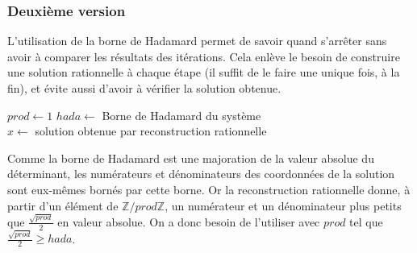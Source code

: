 \documentclass[french]{article}
\begin{document}
\subsubsection{Deuxième version} \label{subsubsec:modalg2}
L'utilisation de la borne de Hadamard permet de savoir quand s'arrêter sans avoir à comparer les résultats des itérations. Cela enlève le besoin de construire une solution rationnelle à chaque étape (il suffit de le faire une unique fois, à la fin), et évite aussi d'avoir à vérifier la solution obtenue.
 \newline
\begin{algorithm}[H]
	\DontPrintSemicolon
	$prod \gets 1$
	$hada \gets$ Borne de Hadamard du système\\
	$x \gets$ solution obtenue par reconstruction rationnelle
\end{algorithm}
\leavevmode \par
Comme la borne de Hadamard est une majoration de la valeur absolue du déterminant, les numérateurs et dénominateurs des coordonnées de la solution sont eux-mêmes bornés par cette borne. Or la reconstruction rationnelle donne, à partir d'un élément de $\mathbb{Z}/prod\mathbb{Z}$, un numérateur et un dénominateur plus petits que $\frac{\sqrt{prod}}{2}$ en valeur absolue. On a donc besoin de l'utiliser avec $prod$ tel que $\frac{\sqrt{prod}}{2} \geq hada$.
\end{document}
